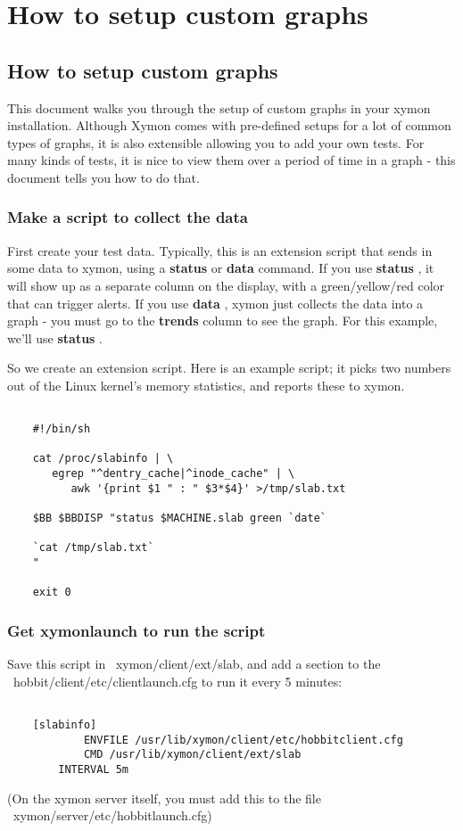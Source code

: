 \chapter{How to setup custom graphs}
\section{How to setup custom graphs}

 This document walks you through the setup of custom graphs in your xymon installation. Although Xymon comes with pre-defined setups for a lot of common types of graphs, it is also extensible allowing you to add your own tests. For many kinds of tests, it is nice to view them over a period of time in a graph - this document tells you how to do that. \subsection{Make a script to collect the data}


 First create your test data. Typically, this is an extension script that sends in some data to xymon, using a \textbf{status}
 or \textbf{data}
 command. If you use \textbf{status}
, it will show up as a separate column on the display, with a green/yellow/red color that can trigger alerts. If you use \textbf{data}
, xymon just collects the data into a graph - you must go to the \textbf{trends}
 column to see the graph. For this example, we'll use \textbf{status}
.


 So we create an extension script. Here is an example script; it picks two numbers out of the Linux kernel's memory statistics, and reports these to xymon. \begin{verbatim}

	#!/bin/sh

	cat /proc/slabinfo | \
	   egrep "^dentry_cache|^inode_cache" | \
	      awk '{print $1 " : " $3*$4}' >/tmp/slab.txt

	$BB $BBDISP "status $MACHINE.slab green `date`

	`cat /tmp/slab.txt`
	"

	exit 0

\end{verbatim}

\subsection{Get xymonlaunch to run the script}


 Save this script in ~xymon/client/ext/slab, and add a section to the ~hobbit/client/etc/clientlaunch.cfg to run it every 5 minutes: \begin{verbatim}

	[slabinfo]
        	ENVFILE /usr/lib/xymon/client/etc/hobbitclient.cfg
	        CMD /usr/lib/xymon/client/ext/slab
		INTERVAL 5m

\end{verbatim}
 (On the xymon server itself, you must add this to the file ~xymon/server/etc/hobbitlaunch.cfg) 
